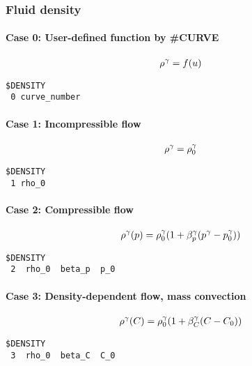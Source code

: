 \subsubsection{Fluid density}

\paragraph*{Case 0: User-defined function by \#CURVE}
\begin{eqnarray}
  \rho^\gamma= f(u)
\end{eqnarray}
\begin{verbatim}
$DENSITY
 0 curve_number
\end{verbatim}

\paragraph*{Case 1: Incompressible flow}
\begin{eqnarray}
  \rho^\gamma = \rho^\gamma_0
\end{eqnarray}
\begin{verbatim}
$DENSITY
 1 rho_0
\end{verbatim}

\paragraph*{Case 2: Compressible flow}
\begin{eqnarray}
  \rho^\gamma(p)
  = \rho_0^\gamma(1+\beta_p^\gamma(p^\gamma-p^\gamma_0))
\end{eqnarray}
\begin{verbatim}
$DENSITY
 2  rho_0  beta_p  p_0
\end{verbatim}

\paragraph*{Case 3: Density-dependent flow, mass convection}
\begin{eqnarray}
  \rho^\gamma(C)
  = \rho_0^\gamma(1+\beta_C^\gamma(C-C_0))
\end{eqnarray}
\begin{verbatim}
$DENSITY
 3  rho_0  beta_C  C_0
\end{verbatim}

